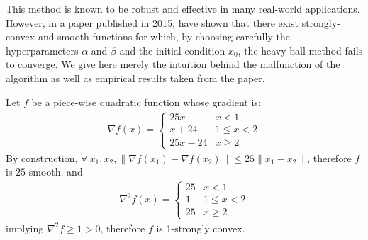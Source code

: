 \documentclass{article}
\begin{document}
This method is known to be robust and effective in many real-world applications. However, in a paper published in 2015, \citet{2014arXiv1408.3595L} have shown that there exist strongly-convex and smooth functions for which, by choosing carefully the hyperparameters $\alpha$ and $\beta$ and the initial condition $x_0$, the heavy-ball method fails to converge. We give here merely the intuition behind the malfunction of the algorithm as well as empirical results taken from the paper.

\vspace{2ex}

Let $f$ be a piece-wise quadratic function whose gradient is:
\begin{gather}
	\nabla f(x) =  \begin{cases}
    25x &   x < 1 \\
    x+24   &  1 \leq x < 2 \\
    25x-24 & x \geq 2
\end{cases}
\end{gather}
By construction,  $\forall \ x_1, x_2, \|\nabla f(x_1)-\nabla f(x_2)\| \leq 25\|x_1 - x_2\|$, therefore $f$ is $25$-smooth, and 
\begin{gather}
\nabla^2 f(x) =
\begin{cases}
    25 &  x < 1 \\
    1   & 1 \leq x < 2 \\
    25 & x\geq 2
\end{cases}
\end{gather}
implying $\nabla^2 f \geq 1>0$, therefore $f$ is 1-strongly convex.\\
\end{document}
